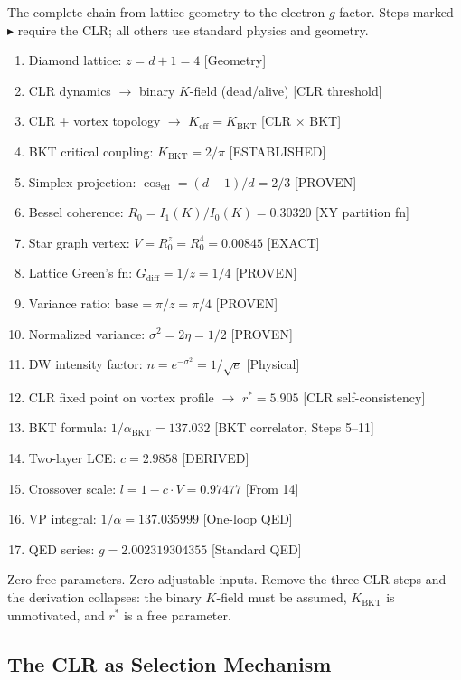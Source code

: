 \documentclass[aps,prd,onecolumn,superscriptaddress,floatfix,12pt]{revtex4-2}
\newcommand{\Rzero}{R_0}
\newcommand{\KBKT}{K_{\text{BKT}}}
\newcommand{\coseff}{\cos_{\text{eff}}}
\newcommand{\Gdiff}{G_{\text{diff}}}
\newcommand{\alphaBKT}{\alpha_{\text{BKT}}}
\begin{document}
The complete chain from lattice geometry to the electron $g$-factor. Steps marked $\blacktriangleright$ require the CLR; all others use standard physics and geometry.
\begin{enumerate}
\item Diamond lattice: $z = d + 1 = 4$ \hfill[Geometry]
\item[$\blacktriangleright$ 2.] CLR dynamics $\to$ binary $K$-field (dead/alive) \hfill[CLR threshold]
\item[$\blacktriangleright$ 3.] CLR + vortex topology $\to$ $K_{\text{eff}} = \KBKT$ \hfill[CLR $\times$ BKT]
\item BKT critical coupling: $\KBKT = 2/\pi$ \hfill[ESTABLISHED]
\item Simplex projection: $\coseff = (d{-}1)/d = 2/3$ \hfill[PROVEN]
\item Bessel coherence: $\Rzero = I_1(K)/I_0(K) = 0.30320$ \hfill[XY partition fn]
\item Star graph vertex: $V = \Rzero^z = \Rzero^4 = 0.00845$ \hfill[EXACT]
\item Lattice Green's fn: $\Gdiff = 1/z = 1/4$ \hfill[PROVEN]
\item Variance ratio: $\text{base} = \pi/z = \pi/4$ \hfill[PROVEN]
\item Normalized variance: $\sigma^2 = 2\eta = 1/2$ \hfill[PROVEN]
\item DW intensity factor: $n = e^{-\sigma^2} = 1/\sqrt{e}$ \hfill[Physical]
\item[$\blacktriangleright$ 12.] CLR fixed point on vortex profile $\to$ $r^* = 5.905$ \hfill[CLR self-consistency]
\item BKT formula: $1/\alphaBKT = 137.032$ \hfill[BKT correlator, Steps 5--11]
\item Two-layer LCE: $c = 2.9858$ \hfill[DERIVED]
\item Crossover scale: $l = 1 - c \cdot V = 0.97477$ \hfill[From 14]
\item VP integral: $1/\alpha = 137.035999$ \hfill[One-loop QED]
\item QED series: $g = 2.002319304355$ \hfill[Standard QED]
\end{enumerate}
Zero free parameters. Zero adjustable inputs. Remove the three CLR steps and the derivation collapses: the binary $K$-field must be assumed, $\KBKT$ is unmotivated, and $r^*$ is a free parameter.

\subsection*{The CLR as Selection Mechanism}
\end{document}
